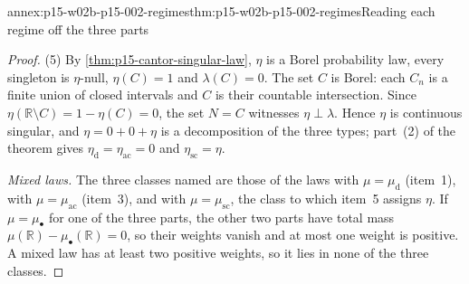 \begin{annexitem}{annex:p15-w02b-p15-002-regimes}{thm:p15-w02b-p15-002-regimes}{Reading each regime off the three parts}
\begin{proof}
(5) By \cref{thm:p15-cantor-singular-law}, \(\eta\) is a Borel
probability law, every singleton is \(\eta\)-null, \(\eta(C)=1\) and
\(\lambda(C)=0\). The set \(C\) is Borel: each \(C_n\) is a finite union
of closed intervals and \(C\) is their countable intersection. Since
\(\eta(\mathbb R\setminus C)=1-\eta(C)=0\), the set \(N=C\) witnesses
\(\eta\perp\lambda\). Hence \(\eta\) is continuous singular, and
\(\eta=0+0+\eta\) is a decomposition of the three types; part~(2) of the
theorem gives \(\eta_{\mathrm d}=\eta_{\mathrm{ac}}=0\) and
\(\eta_{\mathrm{sc}}=\eta\).

\emph{Mixed laws.} The three classes named are those of the laws with
\(\mu=\mu_{\mathrm d}\) (item~1), with \(\mu=\mu_{\mathrm{ac}}\)
(item~3), and with \(\mu=\mu_{\mathrm{sc}}\), the class to which item~5
assigns \(\eta\). If \(\mu=\mu_\bullet\) for one of the three parts, the
other two parts have total mass
\(\mu(\mathbb R)-\mu_\bullet(\mathbb R)=0\), so their weights vanish and
at most one weight is positive. A mixed law has at least two positive
weights, so it lies in none of the three classes.
\end{proof}
\end{annexitem}

